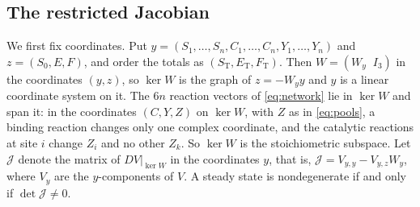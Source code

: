 \documentclass[11pt]{article}
\theoremstyle{plain}
\theoremstyle{definition}
\theoremstyle{remark}
\numberwithin{equation}{section}
\newcommand{\ET}{E_{\mathrm T}}
\newcommand{\FT}{F_{\mathrm T}}
\newcommand{\ST}{S_{\mathrm T}}
\newcommand{\JS}{\mathcal J}
\begin{document}
\subsection{The restricted Jacobian}
We first fix coordinates. Put \(y=(S_1,\dots,S_n,C_1,\dots,C_n,Y_1,\dots,Y_n)\) and
\(z=(S_0,E,F)\), and order the totals as \((\ST,\ET,\FT)\). Then \(W=(W_y\;\;I_3)\) in the
coordinates \((y,z)\), so \(\ker W\) is the graph of \(z=-W_yy\) and \(y\) is a linear
coordinate system on it. The \(6n\) reaction vectors of \eqref{eq:network} lie in \(\ker W\)
and span it: in the coordinates \((C,Y,Z)\) on \(\ker W\), with \(Z\) as in \eqref{eq:pools},
a binding reaction changes only one complex coordinate, and the catalytic reactions at site
\(i\) change \(Z_i\) and no other \(Z_k\). So \(\ker W\) is the stoichiometric subspace. Let
\(\JS\) denote the matrix of \(DV|_{\ker W}\) in the coordinates \(y\), that is,
\(\JS=V_{y,y}-V_{y,z}W_y\), where \(V_y\) are the \(y\)-components of \(V\). A steady state is
nondegenerate if and only if \(\det\JS\ne0\).
\end{document}
